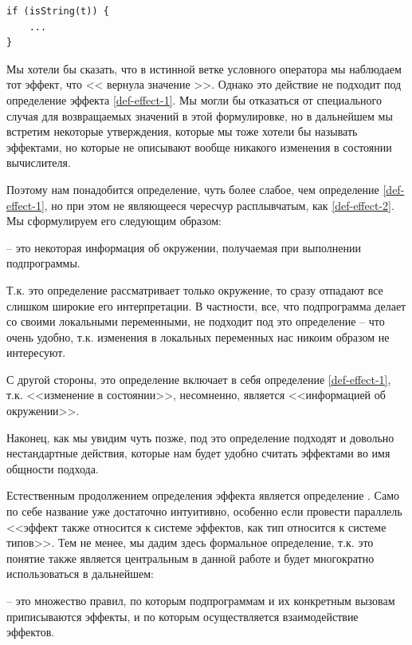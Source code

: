 \begin{verbatim}
if (isString(t)) {
    ...
}
\end{verbatim}

Мы хотели бы сказать, что в истинной ветке условного оператора мы наблюдаем тот эффект, что << вернула значение >>. Однако это действие не подходит под определение эффекта \ref{def-effect-1}. Мы могли бы отказаться от специального случая для возвращаемых значений в этой формулировке, но в дальнейшем мы встретим некоторые утверждения, которые мы тоже хотели бы называть эффектами, но которые не описывают вообще никакого изменения в состоянии вычислителя.

Поэтому нам понадобится определение, чуть более слабое, чем определение \ref{def-effect-1}, но при этом не являющееся чересчур расплывчатым, как \ref{def-effect-2}. Мы сформулируем его следующим образом:

\begin{definition}
    \label{def-effect}
     -- это некоторая информация об окружении, получаемая при выполнении подпрограммы.
\end{definition}

Т.к. это определение рассматривает только окружение, то сразу отпадают все слишком широкие его интерпретации. В частности, все, что подпрограмма делает со своими локальными переменными, не подходит под это определение -- что очень удобно, т.к. изменения в локальных переменных нас никоим образом не интересуют.

С другой стороны, это определение включает в себя определение \ref{def-effect-1}, т.к. <<изменение в состоянии>>, несомненно, является <<информацией об окружении>>.

Наконец, как мы увидим чуть позже, под это определение подходят и довольно нестандартные действия, которые нам будет удобно считать эффектами во имя общности подхода.


\bigskip

Естественным продолжением определения эффекта является определение . Само по себе название уже достаточно интуитивно, особенно если провести параллель <<эффект также относится к системе эффектов, как тип относится к системе типов>>. Тем не менее, мы дадим здесь формальное определение, т.к. это понятие также является центральным в данной работе и будет многократно использоваться в дальнейшем:

\begin{definition}
     -- это множество правил, по которым подпрограммам и их конкретным вызовам приписываются эффекты, и по которым осуществляется взаимодействие эффектов.
\end{definition}




